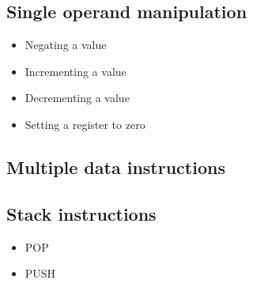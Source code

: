 \documentclass{article}[18pt]
\begin{document}
\subsection{Single operand manipulation}
\begin{itemize}
	\item Negating a value
	\item Incrementing a value
	\item Decrementing a value
	\item Setting a register to zero
\end{itemize}
\subsection{Multiple data instructions}
\subsection{Stack instructions}
\begin{itemize}
	\item POP
	\item PUSH
\end{itemize}
\end{document}
